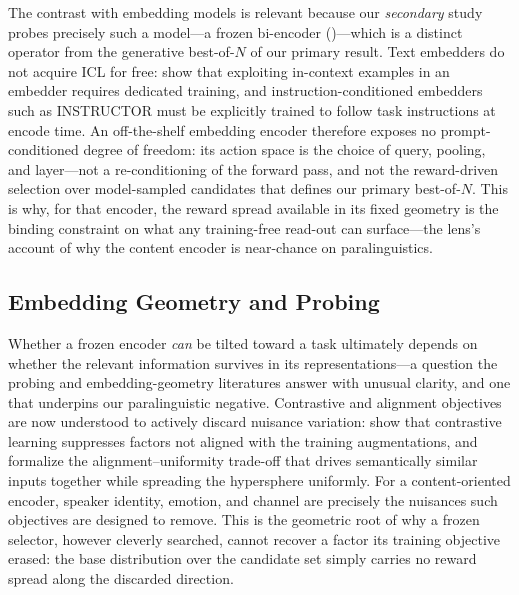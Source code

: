 The contrast with embedding models is relevant because our \emph{secondary} study probes precisely such a model---a frozen bi-encoder ()---which is a distinct operator from the generative best-of-$N$ of our primary result. Text embedders do not acquire ICL for free: \citet{bgeenicl2024} show that exploiting in-context examples in an embedder requires dedicated training, and instruction-conditioned embedders such as INSTRUCTOR \citep{su2023instructor} must be explicitly trained to follow task instructions at encode time. An off-the-shelf embedding encoder therefore exposes no prompt-conditioned degree of freedom: its action space is the choice of query, pooling, and layer---not a re-conditioning of the forward pass, and not the reward-driven selection over model-sampled candidates that defines our primary best-of-$N$. This is why, for that encoder, the reward spread available in its fixed geometry is the binding constraint on what any training-free read-out can surface---the lens's account of why the content encoder is near-chance on paralinguistics.

\subsection{Embedding Geometry and Probing}
\label{sec:rw-geometry}

Whether a frozen encoder \emph{can} be tilted toward a task ultimately depends on whether the relevant information survives in its representations---a question the probing and embedding-geometry literatures answer with unusual clarity, and one that underpins our paralinguistic negative. Contrastive and alignment objectives are now understood to actively discard nuisance variation: \citet{xiao2020whatnot} show that contrastive learning suppresses factors not aligned with the training augmentations, and \citet{wang2020alignuniform} formalize the alignment--uniformity trade-off that drives semantically similar inputs together while spreading the hypersphere uniformly. For a content-oriented encoder, speaker identity, emotion, and channel are precisely the nuisances such objectives are designed to remove. This is the geometric root of why a frozen selector, however cleverly searched, cannot recover a factor its training objective erased: the base distribution \qo over the candidate set simply carries no reward spread along the discarded direction.

